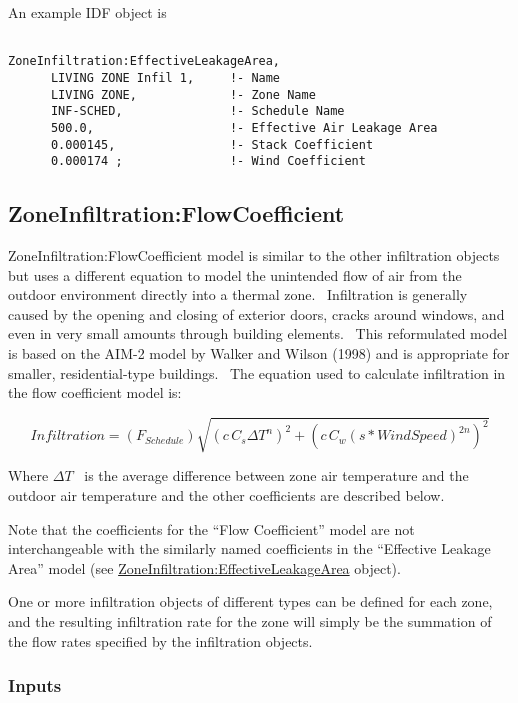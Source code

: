 An example IDF object is

\begin{lstlisting}

ZoneInfiltration:EffectiveLeakageArea,
      LIVING ZONE Infil 1,     !- Name
      LIVING ZONE,             !- Zone Name
      INF-SCHED,               !- Schedule Name
      500.0,                   !- Effective Air Leakage Area
      0.000145,                !- Stack Coefficient
      0.000174 ;               !- Wind Coefficient
\end{lstlisting}

\subsection{ZoneInfiltration:FlowCoefficient}\label{zoneinfiltrationflowcoefficient}

ZoneInfiltration:FlowCoefficient model is similar to the other infiltration objects but uses a different equation to model the unintended flow of air from the outdoor environment directly into a thermal zone.~ Infiltration is generally caused by the opening and closing of exterior doors, cracks around windows, and even in very small amounts through building elements.~ This reformulated model is based on the AIM-2 model by Walker and Wilson (1998) and is appropriate for smaller, residential-type buildings.~ The equation used to calculate infiltration in the flow coefficient model is:

\begin{equation}
Infiltration = \left( {{F_{Schedule}}} \right)\sqrt {{{\left( {c\,{C_s}\Delta {T^n}} \right)}^2} + {{\left( {c\,{C_w}{{\left( {s * WindSpeed} \right)}^{2n}}} \right)}^2}}
\end{equation}

Where \(\Delta T\) ~is the average difference between zone air temperature and the outdoor air temperature and the other coefficients are described below.

Note that the coefficients for the ``Flow Coefficient'' model are not interchangeable with the similarly named coefficients in the ``Effective Leakage Area'' model (see \hyperref[zoneinfiltrationeffectiveleakagearea]{ZoneInfiltration:EffectiveLeakageArea} object).

One or more infiltration objects of different types can be defined for each zone, and the resulting infiltration rate for the zone will simply be the summation of the flow rates specified by the infiltration objects.

\subsubsection{Inputs}\label{inputs-2-005}


